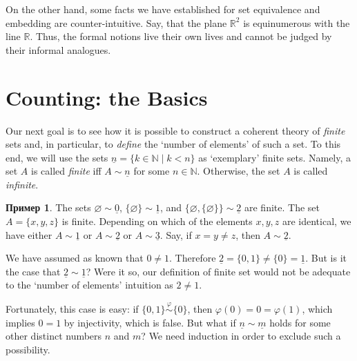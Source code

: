 \documentclass[12pt,notitlepage]{article}
\theoremstyle{plain}
\theoremstyle{definition}
\newtheorem{exm}[thm]{Пример}
\theoremstyle{plain}
\newcommand{\N}{\mathbb{N}}
\newcommand{\R}{\mathbb{R}}
\newcommand{\void}{\varnothing}
\renewcommand{\phi}{\varphi}
\newcommand{\ul}[1]{\underline{#1}}
\newcommand{\1}{\mathbf{1}}
\newcommand{\0}{\mathbf{0}}
\newcommand{\mcomm}[1]{}
\begin{document}
On the other hand, some facts we have established for set equivalence and embedding are counter-intuitive. Say, that the plane $\R^2$ is equinumerous with the line $\R$. Thus, the formal notions live their own lives and cannot be judged by their informal analogues.

\section{Counting: the Basics}\label{sect:comb1}
\mcomm{This section contains a (reasonably) rigorous presentation of combinatorics' foundations including the Pigeonhole Principle, the Rules of Sum and Product. We try to prove as much as possible when avoiding explicit recursion and the Axiom of Choice.}

Our next goal is to see how it is possible to construct a coherent theory of \emph{finite} sets and, in particular, to \emph{define} the `number of elements' of such a set. To this end, we will use the sets $\ul{n} = \{k \in \N \mid k < n \}$ as `exemplary' finite sets. Namely, a set $A$ is called \emph{finite} iff $A \sim \ul{n}$ for some $n \in \N$. Otherwise, the set $A$ is called \emph{infinite}.

\begin{exm}
	The sets $\void \sim \ul{0}$, $\{\void\} \sim \ul{1}$, and $\{\void, \{\void\}\} \sim \ul{2}$ are finite. The set $A = \{x,y,z\}$ is finite. Depending on which of the elements $x,y,z$ are identical, we have either $A \sim \ul{1}$ or $A \sim \ul{2}$ or $A \sim \ul{3}$. Say, if $x = y \neq z$, then $A \sim \ul{2}$.
\end{exm}

We have assumed as known that $0 \neq 1$. Therefore $\ul{2} = \{0,1\} \neq \{0\} = \ul{1}$. But is it the case that $\ul{2} \sim \ul{1}$? Were it so, our definition of finite set would not be adequate to the `number of elements' intuition as $2 \neq 1$.

Fortunately, this case is easy: if $\{0,1\} \stackrel{\phi}{\sim} \{0\}$, then $\phi(0) = 0 = \phi(1)$, which implies $0 = 1$ by injectivity, which is false. But what if $\ul{n} \sim \ul{m}$ holds for some other distinct numbers $n$ and $m$? We need induction in order to exclude such a possibility.
\end{document}
